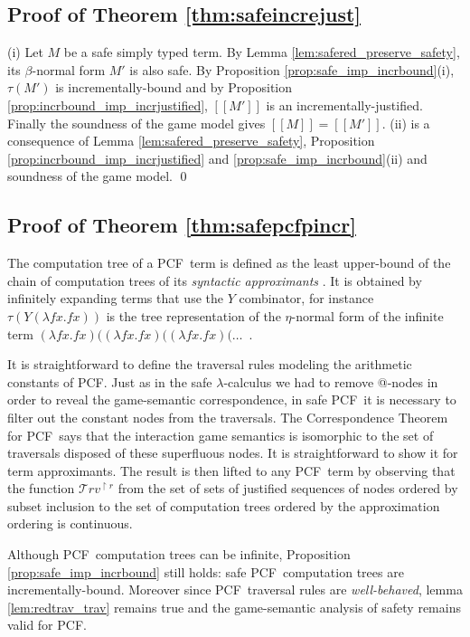 \documentclass{llncs}
\newcommand\travset{\mathcal{T}rv}
\newcommand{\sem}[1]{{[\![ #1 ]\!]}}
\newcommand\pcf{\textsf{PCF}}
\begin{document}
\subsection{Proof of Theorem \ref{thm:safeincrejust}}
(i) Let $M$ be a safe simply typed term. By Lemma \ref{lem:safered_preserve_safety}, its $\beta$-normal form $M'$ is also safe. By Proposition \ref{prop:safe_imp_incrbound}(i), $\tau(M')$ is incrementally-bound and by Proposition
\ref{prop:incrbound_imp_incrjustified}, $\sem{M'}$ is an
incrementally-justified. Finally the soundness of the game model gives $\sem{M} = \sem{M'}$.
(ii) is a consequence of Lemma \ref{lem:safered_preserve_safety},
Proposition \ref{prop:incrbound_imp_incrjustified}  and 
\ref{prop:safe_imp_incrbound}(ii) and soundness of the game model.
\qed

\subsection{Proof of Theorem \ref{thm:safepcfpincr}}

The computation tree of a \pcf\ term is defined as the least upper-bound of
the chain of computation trees of its \emph{syntactic approximants} \cite{abramsky:game-semantics-tutorial}.
It is obtained by infinitely expanding terms that use the $Y$ combinator, for instance
$\tau(Y (\lambda f x. f x))$ is
the tree representation of the $\eta$-normal form of the infinite term
$(\lambda f x. f x) ((\lambda f x. f x) ((\lambda f x. f x)  (
\ldots$\ .


It is straightforward to define the traversal rules modeling the arithmetic constants of \pcf. Just as in the safe $\lambda$-calculus we had to remove @-nodes in order to reveal the game-semantic correspondence, in safe \pcf\ it is necessary to filter out the constant nodes from the traversals. The Correspondence Theorem for \pcf\ says that the interaction game semantics is isomorphic to the set of traversals disposed of these superfluous nodes. It is straightforward to show it for term approximants. The result is then lifted to any \pcf\ term by observing that the function $\travset^{\upharpoonright r}$ from the set of sets of justified sequences of nodes ordered by subset inclusion to the set of computation trees ordered by the approximation ordering
is continuous.

Although \pcf\ computation trees can be infinite, Proposition \ref{prop:safe_imp_incrbound} still holds:
safe \pcf\ computation trees are incrementally-bound.
Moreover since \pcf\ traversal rules are \emph{well-behaved}, lemma \ref{lem:redtrav_trav} remains true and the game-semantic analysis of safety remains valid for \pcf.
\end{document}
